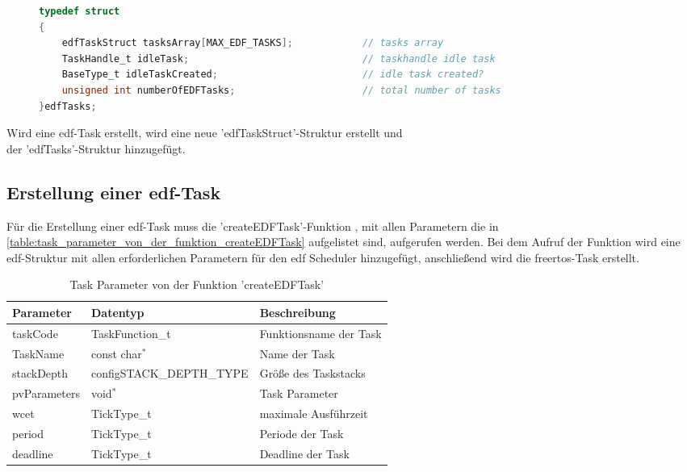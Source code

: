 \documentclass[../EDF Master Thesis.tex]{subfiles}
\begin{document}
\begin{figure}[ht!]
\begin{lstlisting}[language=C, caption=edfTasks Struktur, label=code:edfTasks]
typedef struct
{
    edfTaskStruct tasksArray[MAX_EDF_TASKS];            // tasks array
    TaskHandle_t idleTask;                              // taskhandle idle task
    BaseType_t idleTaskCreated;                         // idle task created?
    unsigned int numberOfEDFTasks;                      // total number of tasks
}edfTasks;
\end{lstlisting}
\end{figure}

Wird eine \ac{edf}-Task erstellt, wird eine neue 'edfTaskStruct'-Struktur erstellt und \\der 'edfTasks'-Struktur hinzugefügt.

\subsection{Erstellung einer \acf{edf}-Task} \label{section:erstellung_einer_edf_task}

    Für die Erstellung einer \ac{edf}-Task muss die 'createEDFTask'-Funktion , mit allen Parametern die in \autoref{table:task_parameter_von_der_funktion_createEDFTask} aufgelistet sind, aufgerufen werden.
    Bei dem Aufruf der Funktion wird eine \ac{edf}-Struktur mit allen erforderlichen Parametern für den \ac{edf} Scheduler hinzugefügt, anschließend wird die \ac{freertos}-Task erstellt.

    \begin{table}[H]
        \centering
        \begin{tabular}{l|l|l}
            Parameter & Datentyp & Beschreibung \\
            \hline
            taskCode & TaskFunction\_t & Funktionsname der Task \\
            TaskName & const char\( ^* \) & Name der Task  \\
            stackDepth & configSTACK\_DEPTH\_TYPE & Größe des Taskstacks \\
            pvParameters & void\( ^* \) & Task Parameter \\
            wcet & TickType\_t & maximale Ausführzeit \\ 
            period & TickType\_t & Periode der Task \\
            deadline & TickType\_t & Deadline der Task \\
        \end{tabular}
        \caption{Task Parameter von der Funktion 'createEDFTask'}
        \label{table:task_parameter_von_der_funktion_createEDFTask}
    \end{table}
\end{document}
